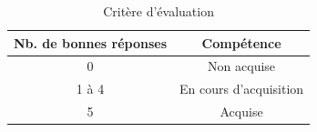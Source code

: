 \setcounter{table}{0}
\begin{table}[h!tbp]
\centering
\begin{tabular}{|c|c|}
\hline 
\textbf{Nb. de bonnes réponses} & \textbf{Compétence} \\ 
\hline 
0 & Non acquise \\ 
1 à 4 & En cours d’acquisition \\
5 & Acquise \\ 
\hline 
\end{tabular}
\caption{\label{criteres} Critère d’évaluation}
\end{table}

\clearpage
